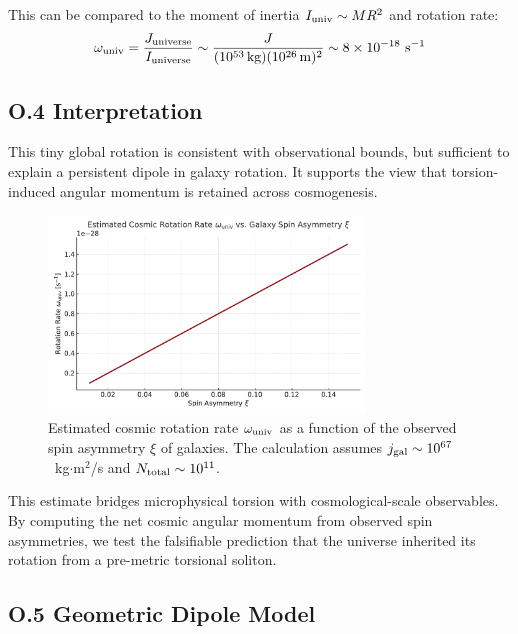 \documentclass{article}
\begin{document}
This can be compared to the moment of inertia $I_{\rm univ} \sim MR^2$ and rotation rate:
\begin{equation}
\omega_{\rm univ} = \frac{J_{\rm universe}}{I_{\rm universe}} \sim \frac{J}{(10^{53}\,\text{kg})(10^{26}\,\text{m})^2} \sim 8 \times 10^{-18}~\text{s}^{-1}
\end{equation}

\subsection*{O.4 Interpretation}
This tiny global rotation is consistent with observational bounds, but sufficient to explain a persistent dipole in galaxy rotation. It supports the view that torsion-induced angular momentum is retained across cosmogenesis.

\begin{figure}[h!]
\centering
\includegraphics[width=0.75\textwidth]{Omega_vs_xi_GENESIS.pdf}
\caption{Estimated cosmic rotation rate $\omega_{\rm univ}$ as a function of the observed spin asymmetry $\xi$ of galaxies. The calculation assumes $j_{\rm gal} \sim 10^{67}$~kg$\cdot$m$^2$/s and $N_{\rm total} \sim 10^{11}$.}
\label{fig:omega_vs_xi}
\end{figure}


\begin{tcolorbox}[colback=gray!5, colframe=black!30, title=Why this matters]
This estimate bridges microphysical torsion with cosmological-scale observables. By computing the net cosmic angular momentum from observed spin asymmetries, we test the falsifiable prediction that the universe inherited its rotation from a pre-metric torsional soliton.
\end{tcolorbox}


\subsection*{O.5 Geometric Dipole Model}
\end{document}
